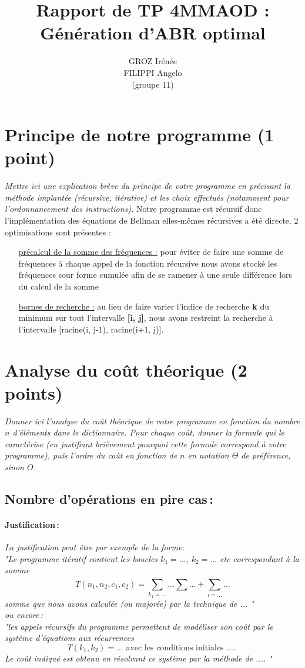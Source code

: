 \documentclass[a4paper, 10pt, french]{article}
\title{Rapport de TP 4MMAOD : Génération d'ABR optimal}
\author{
GROZ Irénée 
\\FILIPPI Angelo 
\\(groupe 11) 
}
\begin{document}
\maketitle


\section{Principe de notre  programme (1 point)}
{\em Mettre ici une explication brève du principe de votre programme en  précisant la méthode implantée (récursive, itérative) et les
choix effectués (notamment pour l'ordonnancement des instructions).
} 
Notre programme est récursif donc l'implémentation des équations de Bellman elles-mêmes récursives a été directe.
2 optimisations sont présentes :
\begin{itemize}
\item[\underline{précalcul de la somme des fréquences :}] pour éviter de faire une somme de fréquences à chaque appel de la fonction récursive nous avons stocké les fréquences sour forme cumulée afin de se ramener à une seule différence lors du calcul de la somme
\item[\underline{bornes de recherche :}] au lieu de faire varier l'indice de recherche \textbf{k} du minimum sur tout l'intervalle \textbf{[i, j]}, nous avons restreint la recherche à l'intervalle [racine(i, j-1), racine(i+1, j)].
\end{itemize}

\section{Analyse du coût théorique (2 points)}
{\em Donner ici l'analyse du coût théorique de votre programme en fonction du nombre $n$ d'éléments dans le dictionnaire.
 Pour chaque coût, donner la formule qui le caractérise (en justifiant brièvement pourquoi cette formule correspond à votre programme), 
 puis l'ordre du coût en fonction de $n$ en notation $\Theta$ de préférence, sinon $O$.}

  \subsection{Nombre  d'opérations en pire cas\,: }
    \paragraph{Justification\,: }
    {\em La justification peut être par exemple de la forme: \\ 
       "Le programme itératif contient les boucles $k_1=...$, $k_2= ...$ etc correspondant à la somme 
      $$T(n_1, n_2, c_1, c_2) = \sum_{k_1=...}^{...} ... \sum ... + \sum_{i=...}^{...} ...$$ 
      somme que nous avons calculée (ou majorée) par la technique de  ... " \\
      ou  encore\,:  \\
      "les appels récursifs du programme permettent de modéliser son coût par le système d'équations aux récurrences 
      $$T(k_1, k_2) = ...  \mbox{~avec~les~conditions~initiales~....~} $$
      Le coût indiqué est obtenu en résolvant ce système par la méthode de  .... "
    } 
\end{document}
